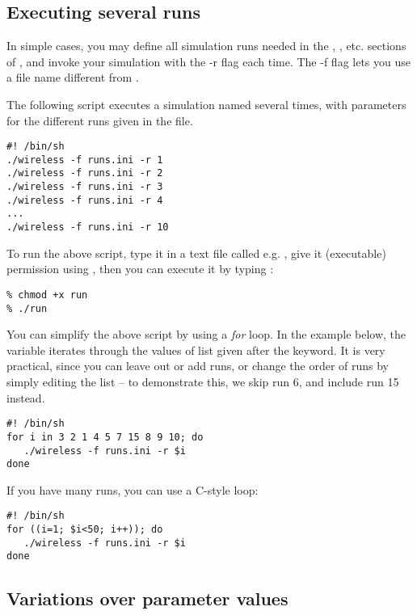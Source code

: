 \subsection{Executing several runs}

In simple cases, you may define all simulation runs needed in the
\ttt{[Run 1]}, \ttt{[Run 2]}, etc. sections of ,
and invoke your simulation with the -r flag each time.
The -f flag lets you use a file name different from .

The following script executes a simulation named 
several times, with parameters for the different runs
given in the  file.

\begin{verbatim}
#! /bin/sh
./wireless -f runs.ini -r 1
./wireless -f runs.ini -r 2
./wireless -f runs.ini -r 3
./wireless -f runs.ini -r 4
...
./wireless -f runs.ini -r 10
\end{verbatim}

To run the above script, type it in a text file called e.g. ,
give it  (executable) permission using ,
then you can execute it by typing :

\begin{verbatim}
% chmod +x run
% ./run
\end{verbatim}

You can simplify the above script by using a \textit{for} loop.
In the example below, the variable  iterates through
the values of list given after the  keyword.
It is very practical, since you can leave out or add runs,
or change the order of runs by simply editing the list --
to demonstrate this, we skip run 6, and include run 15 instead.

\begin{verbatim}
#! /bin/sh
for i in 3 2 1 4 5 7 15 8 9 10; do
   ./wireless -f runs.ini -r $i
done
\end{verbatim}

If you have many runs, you can use a C-style loop:

\begin{verbatim}
#! /bin/sh
for ((i=1; $i<50; i++)); do
   ./wireless -f runs.ini -r $i
done
\end{verbatim}


\subsection{Variations over parameter values}


